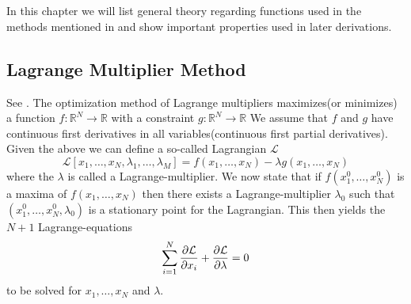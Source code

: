 \chapter{\label{chapter:2}}
    In this chapter we will list general theory regarding functions used in the
    methods mentioned in  and show important properties used
    in later derivations.

\section{Lagrange Multiplier Method\label{sec:lagrange_multipliers}}
    See \cite{calcVar,calcVarSpring}. The optimization method of Lagrange
    multipliers maximizes(or minimizes) a function
    $f:\mathbb{R}^N\rightarrow\mathbb{R}$ with a constraint
    $g:\mathbb{R}^N\rightarrow\mathbb{R}$ We assume that $f$ and $g$ have
    continuous first derivatives in all variables(continuous first partial
    derivatives). \\
    Given the above we can define a so-called Lagrangian
    $\mathcal{L}$
        \begin{equation}
            \mathcal{L}[x_1,\dots,x_N,\lambda_1,\dots,\lambda_M] =
            f(x_1,\dots,x_N) - \lambda g(x_1,\dots,x_N)
            \label{eq:lagrangian}
        \end{equation}
    where the $\lambda$ is called a Lagrange-multiplier. We now state that if
    $f(x^0_1,\dots,x^0_N)$ is a maxima of $f(x_1,\dots,x_N)$ then there exists
    a Lagrange-multiplier $\lambda_0$ such that
    $(x^0_1,\dots,x^0_N,\lambda_0)$ is a stationary point
    for the Lagrangian. This then yields the $N+1$ Lagrange-equations
        \begin{align}
            \sum^N_{i=1} \frac{\mathrm{\partial}\mathcal{L}}{\mathrm{\partial} x_i} +
            \frac{\mathrm{\partial}\mathcal{L}}{\mathrm{\partial} \lambda} = 0
            \label{eq:lagrangeEQ}
        \end{align}
    to be solved for $x_1,\dots,x_N$ and $\lambda$.
